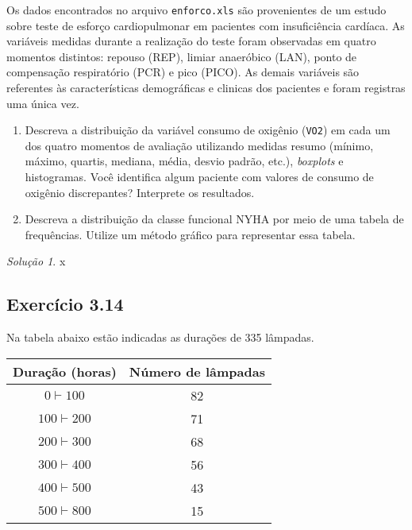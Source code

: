 \documentclass[
]{latex/krantz}
\providecommand{\tightlist}{%
  \setlength{\itemsep}{0pt}\setlength{\parskip}{0pt}}
\theoremstyle{definition}
\theoremstyle{definition}
\theoremstyle{definition}
\theoremstyle{definition}
\theoremstyle{remark}
\newtheorem*{solution}{Solução}
\begin{document}
Os dados encontrados no arquivo \texttt{enforco.xls} são provenientes de um estudo sobre teste de esforço cardiopulmonar em pacientes com insuficiência cardíaca. As variáveis medidas durante a realização do teste foram observadas em quatro momentos distintos: repouso (REP), limiar anaeróbico (LAN), ponto de compensação respiratório (PCR) e pico (PICO). As demais variáveis são referentes às características demográficas e clinicas dos pacientes e foram registras uma única vez.

\begin{enumerate}
\def\labelenumi{\alph{enumi})}
\tightlist
\item
  Descreva a distribuição da variável consumo de oxigênio (\texttt{VO2}) em cada um dos quatro momentos de avaliação utilizando medidas resumo (mínimo, máximo, quartis, mediana, média, desvio padrão, etc.), \emph{boxplots} e histogramas. Você identifica algum paciente com valores de consumo de oxigênio discrepantes? Interprete os resultados.
\item
  Descreva a distribuição da classe funcional NYHA por meio de uma tabela de frequências. Utilize um método gráfico para representar essa tabela.
\end{enumerate}

\begin{solution}
x
\end{solution}

\hypertarget{exr3-14}{%
\subsection*{Exercício 3.14}\label{exr3-14}}

Na tabela abaixo estão indicadas as durações de 335 lâmpadas.

\begin{longtable}[]{@{}cc@{}}
\toprule\noalign{}
Duração (horas) & Número de lâmpadas \\
\midrule\noalign{}
\endhead
\bottomrule\noalign{}
\endlastfoot
\(0 \vdash 100\) & 82 \\
\(100 \vdash 200\) & 71 \\
\(200 \vdash 300\) & 68 \\
\(300 \vdash 400\) & 56 \\
\(400 \vdash 500\) & 43 \\
\(500 \vdash 800\) & 15 \\
\end{longtable}
\end{document}
